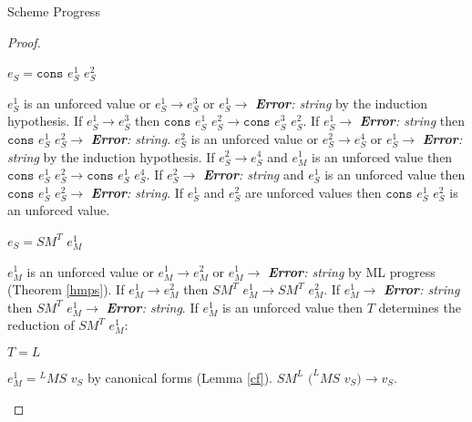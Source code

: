 \begin{theorem}{Scheme Progress}
\begin{proof}
\begin{case}
\end{case}


\begin{case}

$e_{S}=\mathtt{cons}$ $e_{S}^{1}$ $e_{S}^{2}$

$e_{S}^{1}$ is an unforced value or $e_{S}^{1}\rightarrow e_{S}^{3}$ or $e_{S}^{1}\rightarrow$ \emph{\textbf{Error}: string} by the induction hypothesis.  If $e_{S}^{1}\rightarrow e_{S}^{3}$ then $\mathtt{cons}$ $e_{S}^{1}$ $e_{S}^{2}\rightarrow\mathtt{cons}$ $e_{S}^{3}$ $e_{S}^{2}$.  If $e_{S}^{1}\rightarrow$ \emph{\textbf{Error}: string} then $\mathtt{cons}$ $e_{S}^{1}$ $e_{S}^{2}\rightarrow$ \emph{\textbf{Error}: string}.  $e_{S}^{2}$ is an unforced value or $e_{S}^{2}\rightarrow e_{S}^{4}$ or $e_{S}^{1}\rightarrow$ \emph{\textbf{Error}: string} by the induction hypothesis.  If $e_{S}^{2}\rightarrow e_{S}^{4}$ and $e_{M}^{1}$ is an unforced value then $\mathtt{cons}$ $e_{S}^{1}$ $e_{S}^{2}\rightarrow\mathtt{cons}$ $e_{S}^{1}$ $e_{S}^{4}$.  If $e_{S}^{2}\rightarrow$ \emph{\textbf{Error}: string} and $e_{S}^{1}$ is an unforced value then $\mathtt{cons}$ $e_{S}^{1}$ $e_{S}^{2}\rightarrow$ \emph{\textbf{Error}: string}.  If $e_{S}^{1}$ and $e_{S}^{2}$ are unforced values then $\mathtt{cons}$ $e_{S}^{1}$ $e_{S}^{2}$ is an unforced value.

\end{case}


\begin{case}

$e_{S}=SM^{T}$ $e_{M}^{1}$

$e_{M}^{1}$ is an unforced value or $e_{M}^{1}\rightarrow e_{M}^{2}$ or $e_{M}^{1}\rightarrow$ \emph{\textbf{Error}: string} by ML progress (Theorem \ref{hmps}).  If $e_{M}^{1}\rightarrow e_{M}^{2}$ then $SM^{T}$ $e_{M}^{1}\rightarrow SM^{T}$ $e_{M}^{2}$.  If $e_{M}^{1}\rightarrow$ \emph{\textbf{Error}: string} then $SM^{T}$ $e_{M}^{1}\rightarrow$ \emph{\textbf{Error}: string}.  If $e_{M}^{1}$ is an unforced value then $T$ determines the reduction of $SM^{T}$ $e_{M}^{1}$:

\begin{subcase}

$T=L$

$e_{M}^{1}={^{L}M}S$ $v_{S}$ by canonical forms (Lemma \ref{cf}).  $SM^{L}$ $(^{L}MS$ $v_{S})\rightarrow v_{S}$.

\end{subcase}


\end{case}
\end{proof}
\end{theorem}
